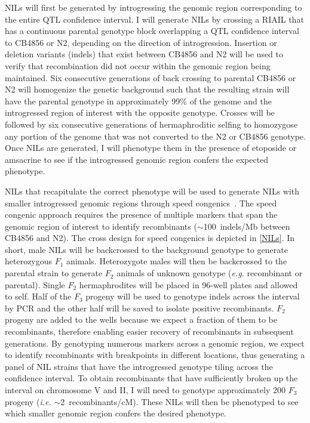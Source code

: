 \documentclass[12pt]{article}
\begin{document}
NILs will first be generated by introgressing the genomic region corresponding to the entire QTL confidence interval. I will generate NILs by crossing a RIAIL that has a continuous parental genotype block overlapping a QTL confidence interval  to CB4856 or N2, depending on the direction of introgression. Insertion or deletion variants (indels) that exist between CB4856 and N2 will be used to verify that recombination did not occur within the genomic region being maintained. Six consecutive generations of back crossing to parental CB4856 or N2 will homogenize the genetic background such that the resulting strain will have the parental genotype in approximately 99\% of the genome and the introgressed region of interest with the opposite genotype. Crosses will be followed by six consecutive generations of hermaphroditic selfing to homozygose any portion of the genome that was not converted to the N2 or CB4856 genotype. Once NILs are generated, I will phenotype them in the presence of etoposide or amsacrine to see if the introgressed genomic region confers the expected phenotype.

\vspace{5pt}

NILs that recapitulate the correct phenotype will be used to generate NILs with smaller introgressed genomic regions through speed congenics~\cite{Wong:2002wc}. The speed congenic approach requires the presence of multiple markers that span the genomic region of interest to identify recombinants ($\sim$100~indels/Mb between CB4856 and N2). The cross design for speed congenics is depicted in \autoref{NILs}. In short, male NILs will be backcrossed to the background genotype to generate heterozygous $F_{1}$ animals. Heterozygote males will then be backcrossed to the parental strain to generate $F_{2}$ animals of unknown genotype ({\it e.g.} recombinant or parental). Single $F_{2}$ hermaphrodites will be placed in 96-well plates and allowed to self. Half of the $F_{3}$ progeny will be used to genotype indels across the interval by PCR and the other half will be saved to isolate positive recombinants. $F_{2}$ progeny are added to the wells because we expect a fraction of them to be recombinants, therefore enabling easier recovery of recombinants in subsequent generations. By genotyping numerous markers across a genomic region, we expect to identify recombinants with breakpoints in different locations, thus generating a panel of NIL strains that have the introgressed genotype tiling across the confidence interval. To obtain recombinants that have sufficiently broken up the interval on chromosome V and II, I will need to genotype approximately 200 $F_{3}$ progeny ({\it i.e.} $\sim$2~recombinants/cM). These NILs will then be phenotyped to see which smaller genomic region confers the desired phenotype. 
\end{document}
